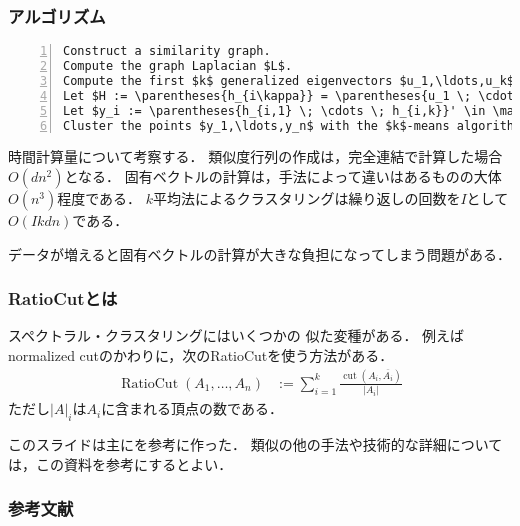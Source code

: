 \documentclass[10pt,hyperref={unicode}]{beamer}
\DeclareMathOperator*{\cut}{cut}
\DeclareMathOperator*{\RatioCut}{RatioCut}
\newcommand{\absolute}[1]{\left|#1\right|}
\newcommand{\parentheses}[1]{\left(#1\right)}
\begin{document}
\begin{frame}[fragile]
\frametitle{アルゴリズム}
\begin{lstlisting}[title={\texttt{Normalized spectral clustering according to Shi and Malik}},mathescape,numbers=left,breaklines]
Construct a similarity graph.
Compute the graph Laplacian $L$.
Compute the first $k$ generalized eigenvectors $u_1,\ldots,u_k$ of the generalized eigenproblem $Lu = \lambda Du$.
Let $H := \parentheses{h_{i\kappa}} = \parentheses{u_1 \; \cdots \; u_k} \in \mathbb{R}^{n \times k}$.
Let $y_i := \parentheses{h_{i,1} \; \cdots \; h_{i,k}}' \in \mathbb{R}^k\,\parentheses{i = 1,\ldots,n}$.
Cluster the points $y_1,\ldots,y_n$ with the $k$-means algorithm into clusters $C_1,\ldots,C_k$.
\end{lstlisting}

\bigskip

時間計算量について考察する．
類似度行列の作成は，完全連結で計算した場合$O\parentheses{dn^2}$となる．
固有ベクトルの計算は，手法によって違いはあるものの大体$O\parentheses{n^3}$程度である．
$k$平均法によるクラスタリングは繰り返しの回数を$I$として$O\parentheses{Ikdn}$である．

\bigskip

データが増えると固有ベクトルの計算が大きな負担になってしまう問題がある．
\end{frame}

\begin{frame}
\frametitle{RatioCutとは}
スペクトラル・クラスタリングにはいくつかの
似た変種がある．
例えばnormalized cutのかわりに，次のRatioCutを使う方法がある．
\begin{align*}
    \RatioCut \parentheses{A_1,\ldots,A_n}
    &:= \sum_{i = 1}^k \frac{\cut\parentheses{A_i,\overline{A_i}}}{\absolute{A_i}}
\end{align*}
ただし$\absolute{A}_i$は$A_i$に含まれる頂点の数である．

\bigskip

このスライドは主に\cite{luxburg2007spectral}を参考に作った．
類似の他の手法や技術的な詳細については，この資料を参考にするとよい．

\end{frame}

\begin{frame}
\frametitle{参考文献}


\end{frame}
\end{document}
